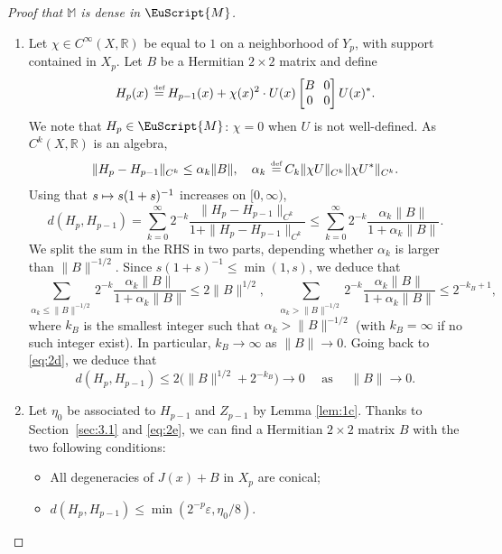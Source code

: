 \documentclass[JEP,XML,SOM,Unicode,NoFloatCountersInSection]{cedram}
\let\pazocal\EuScript
\def\mto{\mathchoice{\longmapsto}{\mapsto}{\mapsto}{\mapsto}}
\theoremstyle{definition}
\newcommand{\MM}{\pazocal{M}}
\newcommand{\R}{\mathbb{R}}
\newcommand{\Mm}{\mathbb{M}}
\let\az\alpha
\let\epsi\varepsilon
\newcommand{\matrice}[1]{\arraycolsep3.5pt\begin{bmatrix}#1\end{bmatrix}}
\newcommand{\de}{\,\mathrel{\stackrel{\makebox[0pt]{\mbox{\normalfont\tiny def}}}{=}}}
\begin{document}
\begin{proof}[Proof that $\Mm$ is dense in $\MM$]
\begin{enumerate}
\item
Let $\chi \in C^\infty(X,\R)$ be equal to $1$ on a neighborhood of $Y_p$, with support contained in $X_p$. Let $B$ be a Hermitian $2 \times 2$ matrix and define
\begin{equation}\label{eq:1r}
H_p(x) \de H_{p-1}(x) + \chi(x)^2 \cdot U(x) \matrice{ B & 0 \\ 0 & 0}U(x)^*.
\end{equation}
We note that
$H_p \in \MM$: $\chi = 0$ when $U$ is not well-defined. As $C^k(X,\R)$ is an algebra,
\begin{equation*}
\| H_p-H_{p-1} \|_{C^k} \leq \az_k \|B\|, \quad \az_k \de C_k \| \chi U \|_{C^k} \| \chi U^* \|_{C^k}.
\end{equation*}
Using that $s \mto s(1+s)^{-1}$ increases on $[0,\infty)$,
\begin{equation}\label{eq:2d}
d(H_p,H_{p-1}) = \sum_{k=0}^\infty 2^{-k} \dfrac{\| H_p-H_{p-1} \|_{C^k} }{1+\| H_p - H_{p-1}\|_{C^k}} \leq \sum_{k=0}^\infty 2^{-k} \dfrac{\az_k \|B\| }{1+\az_k \|B\|}.
\end{equation}
We split the sum in the RHS in two parts, depending whether $\az_k$ is larger than $\|B\|^{-1/2}$. Since $s(1+s)^{-1} \leq \min(1,s)$, we deduce that
\begin{equation*}
\sum_{\az_k \leq \|B\|^{-1/2} } 2^{-k} \dfrac{\az_k \|B\| }{1+\az_k \|B\|} \leq 2\|B\|^{1/2}, \quad \sum_{\az_k > \|B\|^{-1/2} } 2^{-k} \dfrac{\az_k \|B\| }{1+\az_k \|B\|} \leq 2^{-k_B+1},
\end{equation*}
where $k_B$ is the smallest integer such that $\az_k > \| B \|^{-1/2}$ (with $k_B = \infty$ if no such integer exist). In particular, $k_B \to \infty$ as $\| B \| \to 0$. Going back to \eqref{eq:2d}, we deduce that
\begin{equation}\label{eq:2e}
d(H_p,H_{p-1}) \leq 2 \bigl(\| B \|^{1/2} + 2^{-k_B}\bigr) \to 0 \quad \text{ as } \quad \| B \| \to 0.
\end{equation}

\item
Let $\eta_0$ be associated to $H_{p-1}$ and $Z_{p-1}$ by Lemma \ref{lem:1c}.
Thanks to Section~\ref{sec:3.1} and \eqref{eq:2e}, we can find a Hermitian $2 \times 2$ matrix $B$ with the two following conditions:
\begin{itemize}
\item All degeneracies of $J(x) + B$ in $X_p$ are conical;
\item $d(H_p,H_{p-1}) \leq \min\left(2^{-p} \epsi,\eta_0/8\right)$.
\end{itemize}


\end{enumerate}
\end{proof}
\end{document}
